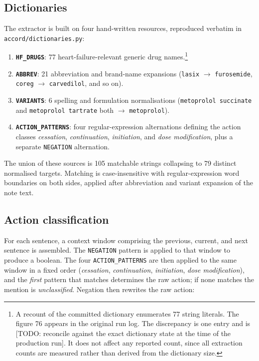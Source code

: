 \subsection{Dictionaries}

The extractor is built on four hand-written resources, reproduced verbatim in
\texttt{accord/dictionaries.py}:

\begin{enumerate}
\item \textbf{\texttt{HF\_DRUGS}}: 77 heart-failure-relevant generic drug
      names.\footnote{A recount of the committed dictionary enumerates 77
      string literals. The figure 76 appears in the original run log. The
      discrepancy is one entry and is [TODO: reconcile against the exact
      dictionary state at the time of the production run]. It does not affect
      any reported count, since all extraction counts are measured rather than
      derived from the dictionary size.}
\item \textbf{\texttt{ABBREV}}: 21 abbreviation and brand-name expansions
      (\texttt{lasix} $\rightarrow$ \texttt{furosemide}, \texttt{coreg}
      $\rightarrow$ \texttt{carvedilol}, and so on).
\item \textbf{\texttt{VARIANTS}}: 6 spelling and formulation normalisations
      (\texttt{metoprolol succinate} and \texttt{metoprolol tartrate} both
      $\rightarrow$ \texttt{metoprolol}).
\item \textbf{\texttt{ACTION\_PATTERNS}}: four regular-expression alternations
      defining the action classes \emph{cessation}, \emph{continuation},
      \emph{initiation}, and \emph{dose modification}, plus a separate
      \texttt{NEGATION} alternation.
\end{enumerate}

The union of these sources is 105 matchable strings collapsing to 79 distinct normalised targets. Matching is
case-insensitive with regular-expression word boundaries on both sides, applied after
abbreviation and variant expansion of the note text.

\subsection{Action classification}

For each sentence, a context window comprising the previous, current, and next
sentence is assembled. The \texttt{NEGATION} pattern is applied to that window
to produce a boolean. The four \texttt{ACTION\_PATTERNS} are then applied to the
same window in a fixed order (\emph{cessation}, \emph{continuation},
\emph{initiation}, \emph{dose modification}), and the \emph{first} pattern that
matches determines the raw action; if none matches the mention is
\emph{unclassified}. Negation then rewrites the raw action:

